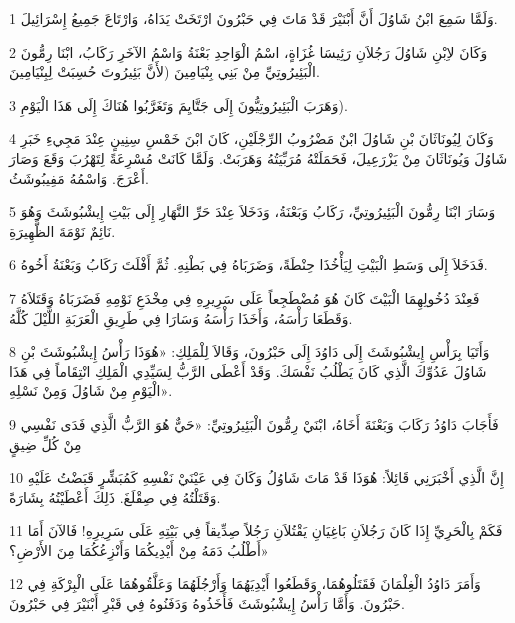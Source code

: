 \par 1 وَلَمَّا سَمِعَ ابْنُ شَاوُلَ أَنَّ أَبْنَيْرَ قَدْ مَاتَ فِي حَبْرُونَ ارْتَخَتْ يَدَاهُ، وَارْتَاعَ جَمِيعُ إِسْرَائِيلَ.
\par 2 وَكَانَ لاِبْنِ شَاوُلَ رَجُلاَنِ رَئِيسَا غُزَاةٍ، اسْمُ الْوَاحِدِ بَعْنَةُ وَاسْمُ الآخَرِ رَكَابُ، ابْنَا رِمُّونَ الْبَئِيرُوتِيِّ مِنْ بَنِي بِنْيَامِينَ (لأَنَّ بَئِيرُوتَ حُسِبَتْ لِبِنْيَامِينَ.
\par 3 وَهَرَبَ الْبَئِيرُوتِيُّونَ إِلَى جَتَّايِمَ وَتَغَرَّبُوا هُنَاكَ إِلَى هَذَا الْيَوْمِ).
\par 4 وَكَانَ لِيُونَاثَانَ بْنِ شَاوُلَ ابْنٌ مَضْرُوبُ الرِّجْلَيْنِ، كَانَ ابْنَ خَمْسِ سِنِينٍ عِنْدَ مَجِيءِ خَبَرِ شَاوُلَ وَيُونَاثَانَ مِنْ يَزْرَعِيلَ، فَحَمَلَتْهُ مُرَبِّيَتُهُ وَهَرَبَتْ. وَلَمَّا كَانَتْ مُسْرِعَةً لِتَهْرُبَ وَقَعَ وَصَارَ أَعْرَجَ. وَاسْمُهُ مَفِيبُوشَثُ.
\par 5 وَسَارَ ابْنَا رِمُّونَ الْبَئِيرُوتِيِّ، رَكَابُ وَبَعْنَةُ، وَدَخَلاَ عِنْدَ حَرِّ النَّهَارِ إِلَى بَيْتِ إِيشْبُوشَثَ وَهُوَ نَائِمٌ نَوْمَةَ الظَّهِيرَةِ.
\par 6 فَدَخَلاَ إِلَى وَسَطِ الْبَيْتِ لِيَأْخُذَا حِنْطَةً، وَضَرَبَاهُ فِي بَطْنِهِ. ثُمَّ أَفْلَتَ رَكَابُ وَبَعْنَةُ أَخُوهُ.
\par 7 فَعِنْدَ دُخُولِهِمَا الْبَيْتَ كَانَ هُوَ مُضْطَجِعاً عَلَى سَرِيرِهِ فِي مِخْدَعِ نَوْمِهِ فَضَرَبَاهُ وَقَتَلاَهُ وَقَطَعَا رَأْسَهُ، وَأَخَذَا رَأْسَهُ وَسَارَا فِي طَرِيقِ الْعَرَبَةِ اللَّيْلَ كُلَّهُ.
\par 8 وَأَتَيَا بِرَأْسِ إِيشْبُوشَثَ إِلَى دَاوُدَ إِلَى حَبْرُونَ، وَقَالاَ لِلْمَلِكِ: «هُوَذَا رَأْسُ إِيشْبُوشَثَ بْنِ شَاوُلَ عَدُوِّكَ الَّذِي كَانَ يَطْلُبُ نَفْسَكَ. وَقَدْ أَعْطَى الرَّبُّ لِسَيِّدِي الْمَلِكِ انْتِقَاماً فِي هَذَا الْيَوْمِ مِنْ شَاوُلَ وَمِنْ نَسْلِهِ».
\par 9 فَأَجَابَ دَاوُدُ رَكَابَ وَبَعْنَةَ أَخَاهُ، ابْنَيْ رِمُّونَ الْبَئِيرُوتِيِّ: «حَيٌّ هُوَ الرَّبُّ الَّذِي فَدَى نَفْسِي مِنْ كُلِّ ضِيقٍ
\par 10 إِنَّ الَّذِي أَخْبَرَنِي قَائِلاً: هُوَذَا قَدْ مَاتَ شَاوُلُ وَكَانَ فِي عَيْنَيْ نَفْسِهِ كَمُبَشِّرٍ قَبَضْتُ عَلَيْهِ وَقَتَلْتُهُ فِي صِقْلَغَ. ذَلِكَ أَعْطَيْتُهُ بِشَارَةً.
\par 11 فَكَمْ بِالْحَرِيِّ إِذَا كَانَ رَجُلاَنِ بَاغِيَانِ يَقْتُلاَنِ رَجُلاً صِدِّيقاً فِي بَيْتِهِ عَلَى سَرِيرِهِ! فَالآنَ أَمَا أَطْلُبُ دَمَهُ مِنْ أَيْدِيكُمَا وَأَنْزِعُكُمَا مِنَ الأَرْضِ؟»
\par 12 وَأَمَرَ دَاوُدُ الْغِلْمَانَ فَقَتَلُوهُمَا، وَقَطَعُوا أَيْدِيَهُمَا وَأَرْجُلَهُمَا وَعَلَّقُوهُمَا عَلَى الْبِرْكَةِ فِي حَبْرُونَ. وَأَمَّا رَأْسُ إِيشْبُوشَثَ فَأَخَذُوهُ وَدَفَنُوهُ فِي قَبْرِ أَبْنَيْرَ فِي حَبْرُونَ.

